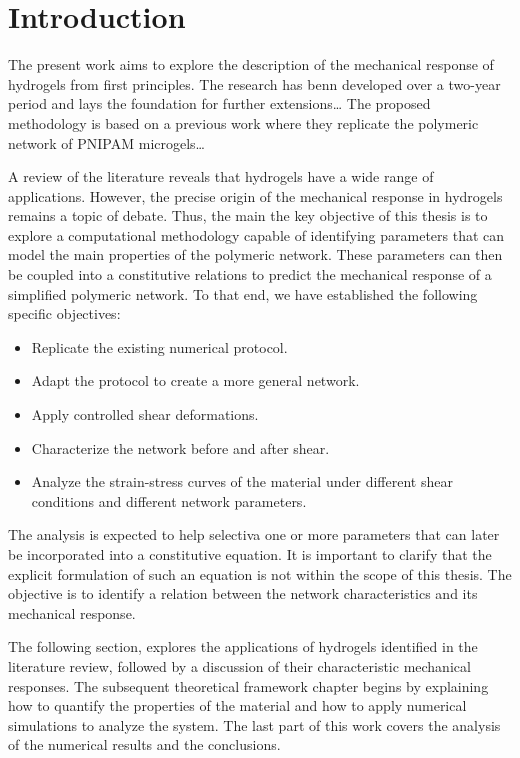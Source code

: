 \chapter{Introduction}\label{ch1:Intro}



The present work aims to explore the description of the mechanical response of hydrogels from first principles.
The research has benn developed over a two-year period and lays the foundation for further extensions\ldots
The proposed methodology is based on a previous work where they replicate the polymeric network of PNIPAM microgels\ldots 

A review of the literature reveals that hydrogels have a wide range of applications.
However, the precise origin of the mechanical response in hydrogels remains a topic of debate.
Thus, the main the key objective of this thesis is to explore a computational methodology capable of identifying parameters that can model the main properties of the polymeric network. 
These parameters can then be coupled into a constitutive relations to predict the mechanical response of a simplified polymeric network.
To that end, we have established the following specific objectives:
\begin{itemize}
    \item Replicate the existing numerical protocol.
    \item Adapt the protocol to create a more general network.
    \item Apply controlled shear deformations.
    \item Characterize the network before and after shear.
    \item Analyze the strain-stress curves of the material under different shear conditions and different network parameters.
\end{itemize}
The analysis is expected to help selectiva one or more parameters that can later be incorporated into a constitutive equation.
It is important to clarify that the explicit formulation of such an equation is not within the scope of this thesis. 
The objective is to identify a relation between the network characteristics and its mechanical response.

The following section, explores the applications of hydrogels identified in the literature review, followed by a discussion of their characteristic mechanical responses.
The subsequent theoretical framework chapter begins by explaining how to quantify the properties of the material and how to apply numerical simulations to analyze the system.
The last part of this work covers the analysis of the numerical results and the conclusions.


